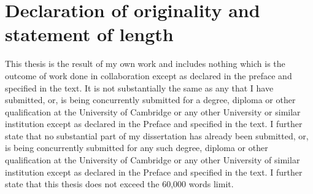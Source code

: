 \chapter{Declaration of originality and statement of length}

This thesis is the result of my own work and includes nothing which is the outcome of work done in collaboration except as declared in the preface and specified in the text. It is not substantially the same as any that I have submitted, or, is being concurrently submitted for a degree, diploma or other qualification at the University of Cambridge or any other University or similar institution except as declared in the Preface and specified in the text. I further state that no substantial part of my dissertation has already been submitted, or, is being concurrently submitted for any such degree, diploma or other qualification at the University of Cambridge or any other University of similar institution except as declared in the Preface and specified in the text. I further state that this thesis does not exceed the 60,000 words limit.